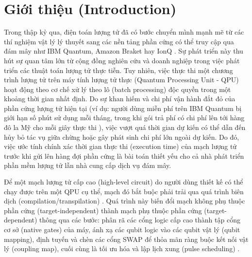 \documentclass[11pt, a4paper]{article}
\begin{document}
\section{Giới thiệu (Introduction)}
Trong thập kỷ qua, điện toán lượng tử đã có bước chuyển mình mạnh mẽ từ các thí nghiệm vật lý lý thuyết sang các nền tảng phần cứng có thể truy cập qua đám mây như IBM Quantum, Amazon Braket hay IonQ \cite{javadi2024qiskit, zhong2020quantum}. Sự phát triển này thu hút sự quan tâm lớn từ cộng đồng nghiên cứu và doanh nghiệp trong việc phát triển các thuật toán lượng tử thực tiễn. Tuy nhiên, việc thực thi một chương trình lượng tử trên máy tính lượng tử thực (Quantum Processing Unit - QPU) hoạt động theo cơ chế xử lý theo lô (batch processing) độc quyền trong một khoảng thời gian nhất định. Do sự khan hiếm và chi phí vận hành đắt đỏ của phần cứng lượng tử hiện tại (ví dụ: người dùng miễn phí trên IBM Quantum bị giới hạn số phút sử dụng mỗi tháng, trong khi gói trả phí có chi phí lên tới hàng đô la Mỹ cho mỗi giây thực thi \cite{ma2025understanding}), việc vượt quá thời gian dự kiến có thể dẫn đến hủy bỏ tác vụ giữa chừng hoặc gây phát sinh chi phí lớn ngoài dự kiến. Do đó, việc ước tính chính xác thời gian thực thi (execution time) của mạch lượng tử trước khi gửi lên hàng đợi phần cứng là bài toán thiết yếu cho cả nhà phát triển phần mềm lượng tử lẫn nhà cung cấp dịch vụ đám mây.

Để một mạch lượng tử cấp cao (high-level circuit) do người dùng thiết kế có thể chạy được trên một QPU cụ thể, mạch đó bắt buộc phải trải qua quá trình biên dịch (compilation/transpilation) \cite{quetschlich2023mqt}. Quá trình này biến đổi mạch không phụ thuộc phần cứng (target-independent) thành mạch phụ thuộc phần cứng (target-dependent) thông qua các bước: phân rã các cổng logic cấp cao thành tập cổng cơ sở (native gates) của máy, ánh xạ các qubit logic vào các qubit vật lý (qubit mapping), định tuyến và chèn các cổng SWAP để thỏa mãn ràng buộc kết nối vật lý (coupling map), cuối cùng là tối ưu hóa và lập lịch xung (pulse scheduling) \cite{li2019tackling, sivarajah2020t}. 
\end{document}

